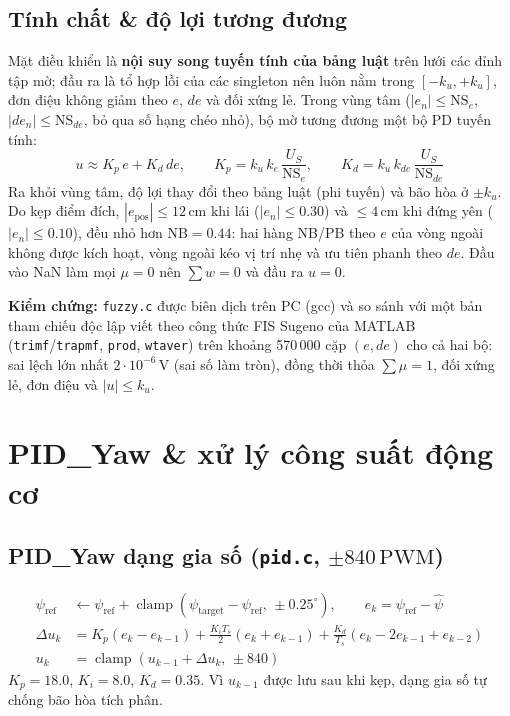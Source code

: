 \documentclass[10pt,a4paper]{article}
\newcommand{\clamp}{\operatorname{clamp}}
\begin{document}
\subsection{Tính chất \& độ lợi tương đương}
Mặt điều khiển là \textbf{nội suy song tuyến tính của bảng luật} trên lưới các đỉnh tập mờ; đầu ra là tổ hợp lồi của các singleton nên luôn nằm trong $[-k_u, +k_u]$, đơn điệu không giảm theo $e$, $de$ và đối xứng lẻ. Trong vùng tâm ($|e_n| \le \text{NS}_e$, $|de_n| \le \text{NS}_{de}$, bỏ qua số hạng chéo nhỏ), bộ mờ tương đương một bộ PD tuyến tính:
\begin{equation}
u \approx K_p\, e + K_d\, de, \qquad K_p = k_u\, k_e\, \frac{U_S}{\text{NS}_e}, \qquad K_d = k_u\, k_{de}\, \frac{U_S}{\text{NS}_{de}}
\end{equation}
Ra khỏi vùng tâm, độ lợi thay đổi theo bảng luật (phi tuyến) và bão hòa ở $\pm k_u$. Do kẹp điểm đích, $|e_{\text{pos}}| \le 12\,\text{cm}$ khi lái ($|e_n| \le 0.30$) và $\le 4\,\text{cm}$ khi đứng yên ($|e_n| \le 0.10$), đều nhỏ hơn $\text{NB} = 0.44$: hai hàng NB/PB theo $e$ của vòng ngoài không được kích hoạt, vòng ngoài kéo vị trí nhẹ và ưu tiên phanh theo $de$. Đầu vào NaN làm mọi $\mu = 0$ nên $\sum w = 0$ và đầu ra $u = 0$.

\textbf{Kiểm chứng:} \texttt{fuzzy.c} được biên dịch trên PC (gcc) và so sánh với một bản tham chiếu độc lập viết theo công thức FIS Sugeno của MATLAB (\texttt{trimf}/\texttt{trapmf}, \texttt{prod}, \texttt{wtaver}) trên khoảng 570\,000 cặp $(e, de)$ cho cả hai bộ: sai lệch lớn nhất $2 \cdot 10^{-6}\,\text{V}$ (sai số làm tròn), đồng thời thỏa $\sum\mu = 1$, đối xứng lẻ, đơn điệu và $|u| \le k_u$.

\section{PID\_Yaw \& xử lý công suất động cơ}
\subsection{PID\_Yaw dạng gia số (\texttt{pid.c}, $\pm 840\,\text{PWM}$)}
\begin{align}
\psi_{\text{ref}} &\leftarrow \psi_{\text{ref}} + \clamp(\psi_{\text{target}} - \psi_{\text{ref}},\, \pm 0.25^\circ), \qquad e_k = \psi_{\text{ref}} - \hat{\psi} \\
\Delta u_k &= K_p (e_k - e_{k-1}) + \frac{K_i T_s}{2}(e_k + e_{k-1}) + \frac{K_d}{T_s}(e_k - 2e_{k-1} + e_{k-2}) \\
u_k &= \clamp(u_{k-1} + \Delta u_k,\, \pm 840)
\end{align}
$K_p = 18.0$, $K_i = 8.0$, $K_d = 0.35$. Vì $u_{k-1}$ được lưu sau khi kẹp, dạng gia số tự chống bão hòa tích phân.
\end{document}
